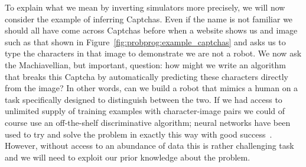 To explain what we mean by inverting simulators more precisely, we will now consider
the example of inferring Captchas.   Even if the name is not familiar we should all
have come across Captchas before when a website shows us and image such
as that shown in Figure~\ref{fig:probprog:example_captchas} and asks us to
type the characters in that image to demonstrate we are not a robot.  We now ask the
Machiavellian, but important, question: how might we write an algorithm that breaks this Captcha by 
automatically predicting these characters directly from the image? In other words, 
can we build a robot that mimics a human on a task specifically designed to 
distinguish between the two.  If we had access to unlimited supply of training examples with
character-image pairs we could of course use an off-the-shelf discriminative algorithm;
neural networks have been used to try and solve the problem in exactly this way with good
success~\citep{von2008recaptcha}.  However, without access to an abundance of data this is rather
challenging task and we will need to exploit our prior knowledge about the problem.  

